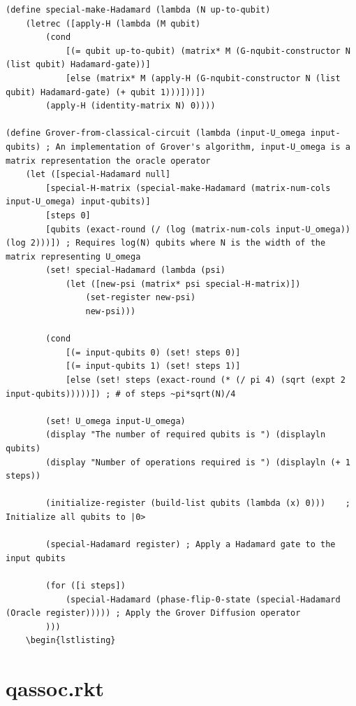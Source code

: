 \documentclass[11pt]{report}
\newcommand{\?}{\stackrel{?}{=}}
\begin{document}
\begin{appendix}
\begin{lstlisting}
(define special-make-Hadamard (lambda (N up-to-qubit)
	(letrec ([apply-H (lambda (M qubit)
		(cond
			[(= qubit up-to-qubit) (matrix* M (G-nqubit-constructor N (list qubit) Hadamard-gate))]
			[else (matrix* M (apply-H (G-nqubit-constructor N (list qubit) Hadamard-gate) (+ qubit 1)))]))])
		(apply-H (identity-matrix N) 0))))

(define Grover-from-classical-circuit (lambda (input-U_omega input-qubits) ; An implementation of Grover's algorithm, input-U_omega is a matrix representation the oracle operator
	(let ([special-Hadamard null]
		[special-H-matrix (special-make-Hadamard (matrix-num-cols input-U_omega) input-qubits)] 
		[steps 0] 
		[qubits (exact-round (/ (log (matrix-num-cols input-U_omega)) (log 2)))]) ; Requires log(N) qubits where N is the width of the matrix representing U_omega
		(set! special-Hadamard (lambda (psi)
			(let ([new-psi (matrix* psi special-H-matrix)])
				(set-register new-psi)
				new-psi)))

		(cond
			[(= input-qubits 0) (set! steps 0)]
			[(= input-qubits 1) (set! steps 1)]
			[else (set! steps (exact-round (* (/ pi 4) (sqrt (expt 2 input-qubits)))))]) ; # of steps ~pi*sqrt(N)/4

		(set! U_omega input-U_omega)
		(display "The number of required qubits is ") (displayln qubits)
		(display "Number of operations required is ") (displayln (+ 1 steps))

		(initialize-register (build-list qubits (lambda (x) 0)))	; Initialize all qubits to |0>

		(special-Hadamard register)	; Apply a Hadamard gate to the input qubits

		(for ([i steps])
			(special-Hadamard (phase-flip-0-state (special-Hadamard (Oracle register))))) ; Apply the Grover Diffusion operator
		)))
	\begin{lstlisting}
	\end{lstlisting}
	
	\chapter{qassoc.rkt}

	
	
\end{appendix}
\end{document}

